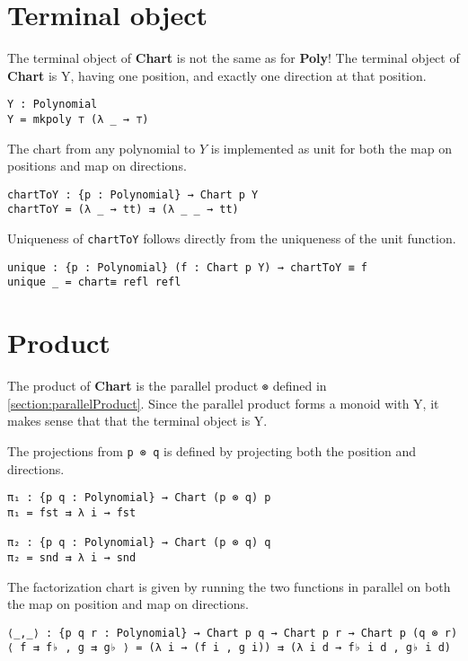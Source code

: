 \section{Terminal object}
The terminal object of \textbf{Chart} is not the same as for \textbf{Poly}! The terminal object of \textbf{Chart} is Y, having one position, and exactly one direction at that position.

\begin{verbatim}
Y : Polynomial
Y = mkpoly ⊤ (λ _ → ⊤)
\end{verbatim}

The chart from any polynomial to $Y$ is implemented as unit for both the map on positions and map on directions. 

\begin{verbatim}
chartToY : {p : Polynomial} → Chart p Y
chartToY = (λ _ → tt) ⇉ (λ _ _ → tt)
\end{verbatim}

Uniqueness of \texttt{chartToY} follows directly from the uniqueness of the unit function.

\begin{verbatim}
unique : {p : Polynomial} (f : Chart p Y) → chartToY ≡ f
unique _ = chart≡ refl refl
\end{verbatim}


\section{Product}
The product of \textbf{Chart} is the parallel product \texttt{⊗} defined in \ref{section:parallelProduct}. Since the parallel product forms a monoid with Y, it makes sense that that the terminal object is Y.

The projections from \texttt{p ⊗ q} is defined by projecting both the position and directions.

\begin{verbatim}
π₁ : {p q : Polynomial} → Chart (p ⊗ q) p
π₁ = fst ⇉ λ i → fst

π₂ : {p q : Polynomial} → Chart (p ⊗ q) q
π₂ = snd ⇉ λ i → snd
\end{verbatim}

The factorization chart is given by running the two functions in parallel on both the map on position and map on directions.

\begin{verbatim}
⟨_,_⟩ : {p q r : Polynomial} → Chart p q → Chart p r → Chart p (q ⊗ r)
⟨ f ⇉ f♭ , g ⇉ g♭ ⟩ = (λ i → (f i , g i)) ⇉ (λ i d → f♭ i d , g♭ i d)
\end{verbatim}

